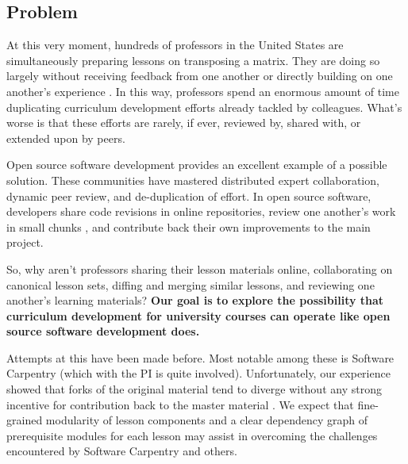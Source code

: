 \documentclass[11pt]{article}
\makeatletter
\newcommand{\authorname}{Kathryn~D.~Huff }
\newcommand{\authoremail}{katyhuff@illinois.edu}
\newcommand{\authorsite}{arfc.npre.illinois.edu}
\makeatother
\begin{document}
          \pagestyle{fancy}
          \lhead{\textcolor{gray}{PI: \authorname (NPRE)\\\authoremail}}
          \rhead{\textcolor{gray}{SIIP Pre-Proposal\\}}
          \renewcommand{\headrulewidth}{0pt}
          \renewcommand{\footrulewidth}{0pt}
          \fancyfoot[C]{\footnotesize \textcolor{gray}{\authorsite}}

          \subsection*{Problem}
          At this very moment, hundreds of professors in the United States are 
          simultaneously preparing lessons on transposing a matrix.
          They are doing so largely without receiving feedback from one another 
          or directly building on one another's experience 
          \cite{green_building_2014}. In this way, 
          professors spend an enormous amount of time duplicating curriculum 
          development efforts already tackled by colleagues. What's worse is 
          that these efforts are rarely, if ever, reviewed by, shared with, or 
          extended upon by peers.
          
          Open source software development provides an excellent 
          example of a possible solution.
          These communities have mastered distributed expert collaboration, 
          dynamic peer review, and de-duplication of effort. In open source 
          software, developers share code revisions in online repositories, 
          review one another's work in small chunks \cite{wilson_best_2014}, 
          and contribute back their own improvements to the main project.

          So, why aren't professors sharing their lesson materials online, 
          collaborating on canonical lesson sets, diffing and merging similar 
          lessons, and reviewing one another's learning materials? \textbf{Our 
          goal is to explore the possibility that curriculum development for 
          university courses can operate like open source software development 
          does.}
           
          Attempts at this have been made before. Most notable among 
          these is Software Carpentry (which with the PI is quite involved). 
          Unfortunately, our experience showed that 
          forks of the original material tend to diverge without any strong 
          incentive for contribution back to the master material 
          \cite{wilson_software_2014,wilson_software_2014-1}. We expect that fine-grained modularity 
          of lesson components and a clear dependency graph of prerequisite 
          modules for each lesson may assist in overcoming the challenges 
          encountered by Software Carpentry and others.
\end{document}
